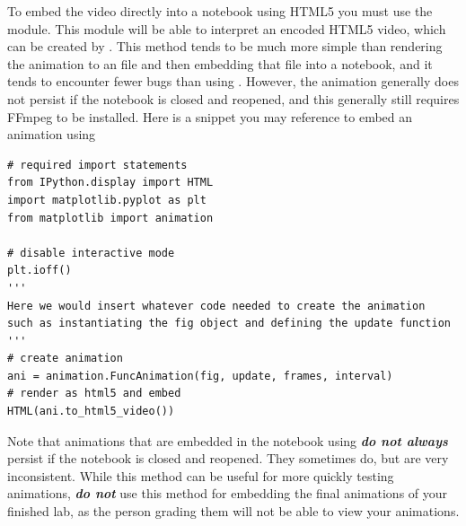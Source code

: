 To embed the video directly into a notebook using HTML5 you must use the  module.
This module will be able to interpret an encoded HTML5 video, which can be created by .
This method tends to be much more simple than rendering the animation to an  file and then embedding that file into a notebook, and it tends to encounter fewer bugs than using .
However, the animation generally does not persist if the notebook is closed and reopened, and this generally still requires FFmpeg to be installed.
Here is a snippet you may reference to embed an animation using 
\begin{lstlisting}
# required import statements
from IPython.display import HTML
import matplotlib.pyplot as plt
from matplotlib import animation

# disable interactive mode
plt.ioff()
'''
Here we would insert whatever code needed to create the animation
such as instantiating the fig object and defining the update function
'''
# create animation
ani = animation.FuncAnimation(fig, update, frames, interval)
# render as html5 and embed
HTML(ani.to_html5_video())
\end{lstlisting}

\begin{warn}
Note that animations that are embedded in the notebook using  \textbf{\emph{do not always}} persist if the notebook is closed and reopened.
They sometimes do, but are very inconsistent.
While this method can be useful for more quickly testing animations, \textbf{\emph{do not}} use this method for embedding the final animations of your finished lab, as the person grading them will not be able to view your animations.
\end{warn}
